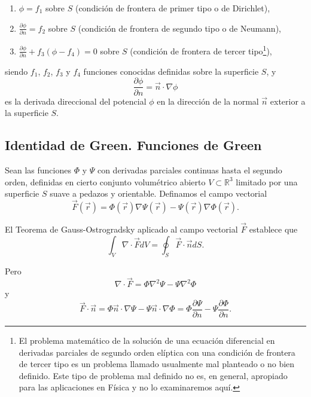 \documentclass[12pt,a4paper]{book}
\begin{document}
\begin{enumerate}
\item $\phi = f_1$ sobre $S$ (condición de frontera de primer tipo o de Dirichlet),
\item $\frac{\partial\phi}{\partial n} = f_2$ sobre $S$ (condición de frontera de segundo tipo o de Neumann),
\item $\frac{\partial\phi}{\partial n} + f_3(\phi - f_4) = 0$ sobre $S$ (condición de frontera de tercer tipo\footnote{El problema matemático de la solución de una ecuación diferencial en derivadas parciales de segundo orden elíptica con una condición de frontera de tercer tipo es un problema llamado usualmente mal planteado o no bien definido. Este tipo de problema mal definido no es, en general, apropiado para las aplicaciones en Física y no lo examinaremos aquí.}),
\end{enumerate}

siendo $f_1$, $f_2$, $f_3$ y $f_4$ funciones conocidas definidas sobre la superficie $S$, y 
\begin{equation}
\frac{\partial\phi}{\partial n} = \vec{n} \cdot \nabla\phi
\end{equation}
es la derivada direccional del potencial $\phi$ en la dirección de la normal $\vec{n}$ exterior a la superficie $S$.

\subsection{Identidad de Green. Funciones de Green}

Sean las funciones $\Phi$ y $\Psi$ con derivadas parciales continuas hasta el segundo orden, definidas en cierto conjunto volumétrico abierto $V \subset \mathbb{R}^3$ limitado por una superficie $S$ suave a pedazos y orientable. Definamos el campo vectorial
\begin{equation}
\vec{F}(\vec{r}) = \Phi(\vec{r})\nabla\Psi(\vec{r}) - \Psi(\vec{r})\nabla\Phi(\vec{r}).
\end{equation}

El Teorema de Gauss-Ostrogradsky aplicado al campo vectorial $\vec{F}$ establece que
\begin{equation}
\int_V \nabla \cdot \vec{F}dV = \oint_S \vec{F} \cdot \vec{n}dS.
\end{equation}

Pero
\begin{equation}
\nabla \cdot \vec{F} = \Phi\nabla^2\Psi - \Psi\nabla^2\Phi
\end{equation}
y
\begin{equation}
\vec{F} \cdot \vec{n} = \Phi \vec{n} \cdot \nabla\Psi - \Psi \vec{n} \cdot \nabla\Phi = \Phi \frac{\partial\Psi}{\partial n} - \Psi \frac{\partial\Phi}{\partial n}.
\end{equation}
\end{document}
